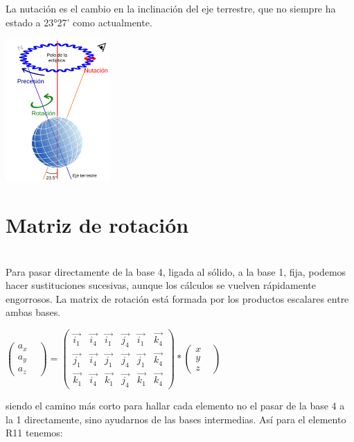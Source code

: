 \documentclass[12pt,a4paper]{report}
\begin{document}
La nutación es el cambio en la inclinación del eje terrestre, que no siempre ha estado a 23°27' como actualmente.
\begin{center}
\includegraphics[width=4cm]{8.png} 
\end{center} 
\section{Matriz de rotación}
\noindent\\
Para pasar directamente de la base 4, ligada al sólido, a la base 1, fija, podemos hacer sustituciones sucesivas, aunque los cálculos se vuelven rápidamente engorrosos. La matrix de rotación está formada por los productos escalares entre ambas bases.
\begin{center}
$\begin{pmatrix}
 a_{x} &\\ 
 a_{y} &\\
 a_{z} &
 \end{pmatrix}=\begin{pmatrix}
 {\overrightarrow{i_{1}}} & {\overrightarrow{i_{4}}} & {\overrightarrow{i_{1}}}& {\overrightarrow{j_{4}}}& {\overrightarrow{i_{1}}}& {\overrightarrow{k_{4}}}\\ 
 {\overrightarrow{j_{1}}} & {\overrightarrow{i_{4}}} & {\overrightarrow{j_{1}}}& {\overrightarrow{j_{4}}}& {\overrightarrow{j_{1}}}& {\overrightarrow{k_{4}}}\\ 
 {\overrightarrow{k_{1}}} & {\overrightarrow{i_{4}}} & {\overrightarrow{k_{1}}}& {\overrightarrow{j_{4}}}& {\overrightarrow{k_{1}}}& {\overrightarrow{k_{4}}}
 \end{pmatrix}*\begin{pmatrix}
 {x}&\\ 
 {y}&\\
 {z}&
 \end{pmatrix}$
\end{center}
siendo el camino más corto para hallar cada elemento no el pasar de la base 4 a la 1 directamente, sino ayudarnos de las bases intermedias. Así para el elemento R11 tenemos:
\end{document}
